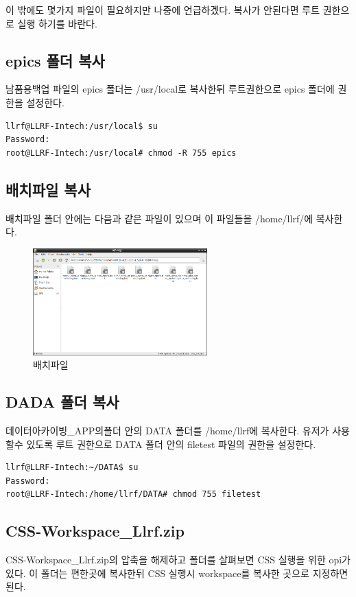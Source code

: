 \documentclass[11pt
  , a4paper
  , article
  , oneside
]{memoir}
\begin{document}
이 밖에도 몇가지 파일이 필요하지만 나중에 언급하겠다. 복사가 안된다면 루트 권한으로 실행 하기를 바란다.
\subsection{epics 폴더 복사}
남품용백업 파일의 epics 폴더는 /usr/local로 복사한뒤 루트권한으로 epics 폴더에 권한을 설정한다.
\begin{lstlisting}[style=termstyle]
llrf@LLRF-Intech:/usr/local$ su
Password: 
root@LLRF-Intech:/usr/local# chmod -R 755 epics
\end{lstlisting}
\subsection{배치파일 복사}
배치파일 폴더 안에는 다음과 같은 파일이 있으며 이 파일들을 /home/llrf/에 복사한다.
\begin{figure}[h!]
		\centering
		\includegraphics[width=0.6\textwidth, height=0.3\textwidth]{./images/2.png}
		\caption{배치파일}
\end{figure}
\subsection{DADA 폴더 복사}
데이터아카이빙\_APP의폴더 안의 DATA 폴더를 /home/llrf에 복사한다. 유저가 사용할수 있도록 루트 권한으로 DATA 폴더 안의 filetest 파일의 권한을 설정한다.
\begin{lstlisting}[style=termstyle]
llrf@LLRF-Intech:~/DATA$ su
Password: 
root@LLRF-Intech:/home/llrf/DATA# chmod 755 filetest
\end{lstlisting}
\subsection{CSS-Workspace\_Llrf.zip}
CSS-Workspace\_Llrf.zip의 압축을 해제하고 폴더를 살펴보면 CSS 실행을 위한 opi가 있다. 이 폴더는 편한곳에 복사한뒤 CSS 실행시 workspace를 복사한 곳으로 지정하면 된다. 
\end{document}
